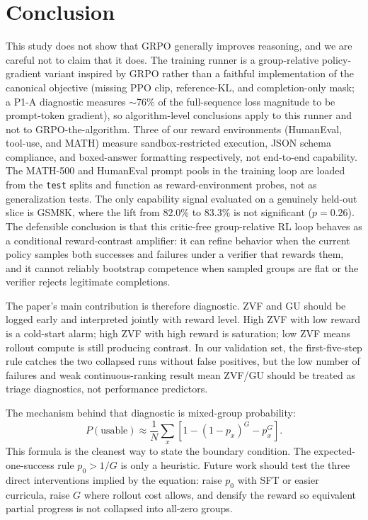 \section{Conclusion}
\label{sec:conclusion}

This study does not show that GRPO generally improves reasoning, and we are
careful not to claim that it does.  The training runner is a group-relative
policy-gradient variant inspired by GRPO rather than a faithful implementation
of the canonical objective (missing PPO clip, reference-KL, and completion-only
mask; a P1-A diagnostic measures $\sim$76\% of the full-sequence loss magnitude
to be prompt-token gradient), so algorithm-level conclusions apply to this
runner and not to GRPO-the-algorithm.  Three of our reward environments
(HumanEval, tool-use, and MATH) measure sandbox-restricted execution, JSON
schema compliance, and boxed-answer formatting respectively, not end-to-end
capability.  The MATH-500 and HumanEval prompt pools in the training loop are
loaded from the \texttt{test} splits and function as reward-environment
probes, not as generalization tests.  The only capability signal evaluated on
a genuinely held-out slice is GSM8K, where the lift from $82.0\%$ to
$83.3\%$ is not significant ($p=0.26$).  The defensible conclusion is that
this critic-free group-relative RL loop behaves as a conditional reward-contrast
amplifier: it can refine behavior when the current policy samples both
successes and failures under a verifier that rewards them, and it cannot
reliably bootstrap competence when sampled groups are flat or the verifier
rejects legitimate completions.

The paper's main contribution is therefore diagnostic.  ZVF and GU should be
logged early and interpreted jointly with reward level.  High ZVF with low
reward is a cold-start alarm; high ZVF with high reward is saturation; low ZVF
means rollout compute is still producing contrast.  In our validation set,
the first-five-step rule catches the two collapsed runs without false
positives, but the low number of failures and weak continuous-ranking result
mean ZVF/GU should be treated as triage diagnostics, not performance
predictors.

The mechanism behind that diagnostic is mixed-group probability:
\[
P(\text{usable}) \approx \frac{1}{N}\sum_x \left[1 - (1-p_x)^G - p_x^G\right].
\]
This formula is the cleanest way to state the boundary condition.  The
expected-one-success rule $p_0>1/G$ is only a heuristic.  Future work should
test the three direct interventions implied by the equation: raise $p_0$ with
SFT or easier curricula, raise $G$ where rollout cost allows, and densify the
reward so equivalent partial progress is not collapsed into all-zero groups.

